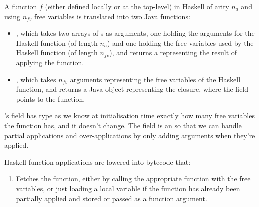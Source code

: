 \documentclass[dissertation.tex]{subfiles}
\begin{document}
{{{{                A function \(f\) (either defined locally or at the top-level) in Haskell of arity \(n_a\) and using
                \(n_{fv}\) free variables is translated into two Java functions:
                
                \begin{itemize}
                \item
                {
                    
                    , which takes two arrays of s as arguments, one holding the
                    arguments for the Haskell function (of length \(n_a\)) and one holding the free variables used by
                    the Haskell function (of length \(n_{fv}\)), and returns a  representing the result
                    of applying the function.

                }
                \item
                {

                    , which takes \(n_{fv}\) arguments representing the free variables of the
                    Haskell function, and returns a Java  object representing the closure, where the
                     field points to the  function.

                }
                \end{itemize}
                
                's  field has type  as we know at initialisation
                time exactly how many free variables the function has, and it doesn't change. The  field
                is an  so that we can handle partial applications and over-applications by
                only adding arguments when they're applied.

                Haskell function applications are lowered into bytecode that:
                \begin{enumerate}
                \item
                {

                    Fetches the function, either by calling the appropriate  function with the free
                    variables, or just loading a local variable if the function has already been partially applied and
                    stored or passed as a function argument.

}
\end{enumerate}}}}}
\end{document}
